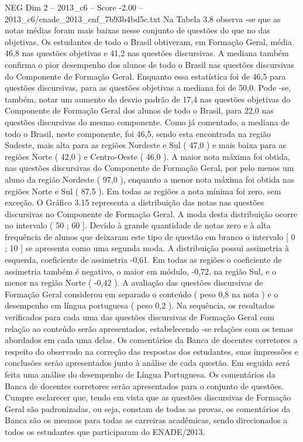 \begin{textsample}{NEG Dim 2 – 2013\_c6 – Score -2.00 – 2013\_c6/enade\_2013\_enf\_7b93b4bd5c.txt}
Na Tabela 3.8 observa -se que as notas médias foram mais baixas nesse conjunto de questões do que no das objetivas.
Os estudantes de todo o Brasil obtiveram, em Formação Geral, média 46,8 nas questões objetivas e 41,2 nas questões discursivas.
A mediana também confirma o pior desempenho dos alunos de todo o Brasil nas questões discursivas do Componente de Formação Geral.
Enquanto essa estatística foi de 46,5 para questões discursivas, para as questões objetivas a mediana foi de 50,0.
Pode -se, também, notar um aumento do desvio padrão de 17,4 nas questões objetivas do Componente de Formação Geral dos alunos de todo o Brasil, para 22,0 nas questões discursivas do mesmo componente.
Como já comentado, a mediana de todo o Brasil, neste componente, foi 46,5, sendo esta encontrada na região Sudeste, mais alta para as regiões Nordeste e Sul ( 47,0 ) e mais baixa para as regiões Norte ( 42,0 ) e Centro-Oeste ( 46,0 ).
A maior nota máxima foi obtida, nas questões discursivas do Componente de Formação Geral, por pelo menos um aluno da região Nordeste ( 97,0 ), enquanto a menor nota máxima foi obtida nas regiões Norte e Sul ( 87,5 ).
Em todas as regiões a nota mínima foi zero, sem exceção.
O Gráfico 3.15 representa a distribuição das notas nas questões discursivas no Componente de Formação Geral.
A moda desta distribuição ocorre no intervalo ( 50 ; 60 ].
Devido à grande quantidade de notas zero e à alta frequência de alunos que deixaram este tipo de questão em branco o intervalo [ 0 ; 10 ] se apresenta como uma segunda moda.
A distribuição possui assimetria à esquerda, coeficiente de assimetria -0,61.
Em todas as regiões o coeficiente de assimetria também é negativo, o maior em módulo, -0,72, na região Sul, e o menor na região Norte ( -0,42 ).
A avaliação das questões discursivas de Formação Geral considerou em separado o conteúdo ( peso 0,8 na nota ) e o desempenho em língua portuguesa ( peso 0,2 ).
Na sequência, os resultados verificados para cada uma das questões discursivas de Formação Geral com relação ao conteúdo serão apresentados, estabelecendo -se relações com os temas abordados em cada uma delas.
Os comentários da Banca de docentes corretores a respeito do observado na correção das respostas dos estudantes, suas impressões e conclusões serão apresentados junto à análise de cada questão.
Em seguida será feita uma análise do desempenho de Língua Portuguesa.
Os comentários da Banca de docentes corretores serão apresentados para o conjunto de questões.
Cumpre esclarecer que, tendo em vista que as questões discursivas de Formação Geral são padronizadas, ou seja, constam de todas as provas, os comentários da Banca são os mesmos para todas as carreiras acadêmicas, sendo direcionados a todos os estudantes que participaram do ENADE/2013.

\end{textsample}
